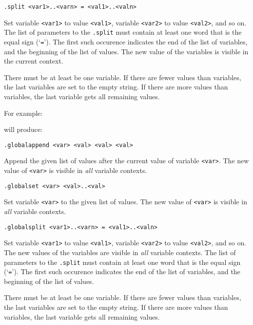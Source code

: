 \begin{verbatim}
.split <var1>..<varn> = <val1>..<valn>
\end{verbatim}
\begin{desc}
Set variable \texttt{<var1>} to value \texttt{<val1>}, variable
\texttt{<var2>} to value \texttt{<val2>}, and so on. The list of
parameters to the \texttt{.split} must contain at least one word
that is the equal sign (`\verb'=''). The first such occurence indicates
the end of the list of variables, and the beginning of the list of
values. The new value of the variables is visible in the current context.

There must be at least be one variable. If there are fewer values
than variables, the last variables are set to the empty string. If
there are more values than variables, the last variable gets all
remaining values.

For example:
\begin{showfile}

\end{showfile}
will produce:
\begin{showfile}

\end{showfile}
\end{desc}

\begin{verbatim}
.globalappend <var> <val> <val> <val>
\end{verbatim}
\begin{desc}
Append the given list of values after the current value of variable
\verb'<var>'. The new value of \texttt{<var>} is visible in \emph{all}
variable contexts.
\end{desc}
\begin{verbatim}
.globalset <var> <val>..<val>
\end{verbatim}
\begin{desc}
Set variable \verb'<var>' to the given list of values.  The new value
of \texttt{<var>} is visible in \emph{all} variable contexts.
\end{desc}
\begin{verbatim}
.globalsplit <var1>..<varn> = <val1>..<valn>
\end{verbatim}
\begin{desc}
Set variable \texttt{<var1>} to value \texttt{<val1>}, variable
\texttt{<var2>} to value \texttt{<val2>}, and so on. The new values
of the variables are visible in \emph{all} variable contexts. The list of
parameters to the \texttt{.split} must contain at least one word
that is the equal sign (`\verb'=''). The first such occurence indicates
the end of the list of variables, and the beginning of the list of
values.

There must be at least be one variable. If there are fewer values
than variables, the last variables are set to the empty string. If
there are more values than variables, the last variable gets all
remaining values.
\end{desc}

